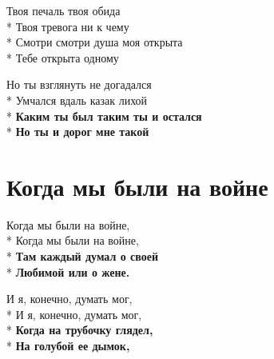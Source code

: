 \medskip

\begin{minipage}{\linewidth}
Твоя печаль твоя обида\\*
Твоя тревога ни к чему\\*
Смотри смотри душа моя открыта\\*
Тебе открыта одному\\
\end{minipage}\par\medskip\nobreak

\medskip

\begin{minipage}{\linewidth}
Но ты взглянуть не догадался\\*
Умчался вдаль казак лихой\\*
\textbf{Каким ты был таким ты и остался}\\*
\textbf{Но ты и дорог мне такой}\\
\end{minipage}

\vspace{\fill}\newpage

\section{Когда мы были на войне}
\label{song:Когда_мы_были_на_войне}

\medskip

\begin{minipage}{\linewidth}
Когда мы были на войне,\\*
Когда мы были на войне,\\*
\textbf{Там каждый думал о своей}\\*
\textbf{Любимой или о жене.}\\
\end{minipage}\par\medskip\nobreak

\medskip

\begin{minipage}{\linewidth}
И я, конечно, думать мог,\\*
И я, конечно, думать мог,\\*
\textbf{Когда на трубочку глядел,}\\*
\textbf{На голубой ее дымок,}\\
\end{minipage}\par\medskip\nobreak


